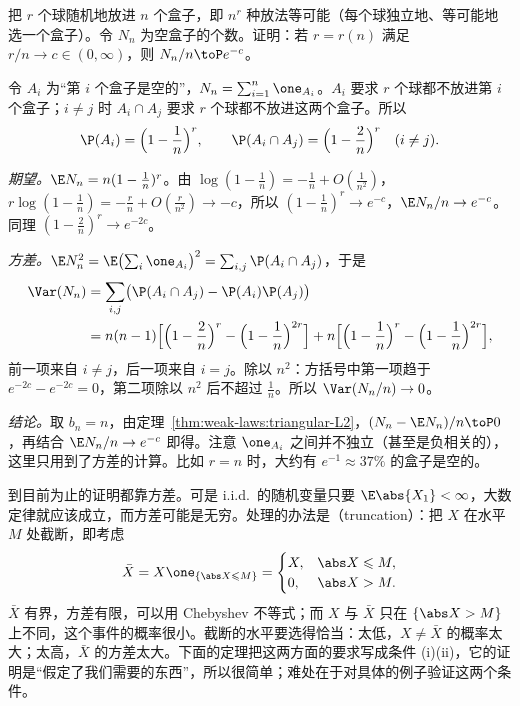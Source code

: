 \begin{workedexample}[占位问题]\label{we:weak-laws:occupancy}
把 $r$ 个球随机地放进 $n$ 个盒子，即 $n^r$ 种放法等可能（每个球独立地、等可能地选一个盒子）。令 $N_n$ 为空盒子的个数。证明：若 $r=r(n)$ 满足 $r/n\to c\in(0,\infty)$，则 $N_n/n\toP e^{-c}$。
\end{workedexample}
\begin{solution}
令 $A_i$ 为“第 $i$ 个盒子是空的”，$N_n=\sum_{i=1}^n\one_{A_i}$。$A_i$ 要求 $r$ 个球都不放进第 $i$ 个盒子；$i\neq j$ 时 $A_i\cap A_j$ 要求 $r$ 个球都不放进这两个盒子。所以
\[
\P(A_i)=\Bigl(1-\frac1n\Bigr)^r,\qquad \P(A_i\cap A_j)=\Bigl(1-\frac2n\Bigr)^r\quad(i\neq j).
\]

\emph{期望。}$\E N_n=n(1-\frac1n)^r$。由 $\log(1-\frac1n)=-\frac1n+O(\frac1{n^2})$，$r\log(1-\frac1n)=-\frac rn+O(\frac r{n^2})\to-c$，所以 $(1-\frac1n)^r\to e^{-c}$，$\E N_n/n\to e^{-c}$。同理 $(1-\frac2n)^r\to e^{-2c}$。

\emph{方差。}$\E N_n^2=\E\bigl(\sum_i\one_{A_i}\bigr)^2=\sum_{i,j}\P(A_i\cap A_j)$，于是
\[
\begin{aligned}
\Var(N_n)&=\sum_{i,j}\bigl(\P(A_i\cap A_j)-\P(A_i)\P(A_j)\bigr)\\
&=n(n-1)\Bigl[\Bigl(1-\frac2n\Bigr)^r-\Bigl(1-\frac1n\Bigr)^{2r}\Bigr]+n\Bigl[\Bigl(1-\frac1n\Bigr)^r-\Bigl(1-\frac1n\Bigr)^{2r}\Bigr],
\end{aligned}
\]
前一项来自 $i\neq j$，后一项来自 $i=j$。除以 $n^2$：方括号中第一项趋于 $e^{-2c}-e^{-2c}=0$，第二项除以 $n^2$ 后不超过 $\frac1n$。所以 $\Var(N_n/n)\to0$。

\emph{结论。}取 $b_n=n$，由定理~\ref{thm:weak-laws:triangular-L2}，$(N_n-\E N_n)/n\toP0$，再结合 $\E N_n/n\to e^{-c}$ 即得。注意 $\one_{A_i}$ 之间并不独立（甚至是负相关的），这里只用到了方差的计算。比如 $r=n$ 时，大约有 $e^{-1}\approx37\%$ 的盒子是空的。
\end{solution}


到目前为止的证明都靠方差。可是 i.i.d.\ 的随机变量只要 $\E\abs{X_1}<\infty$，大数定律就应该成立，而方差可能是无穷。处理的办法是（truncation）：把 $X$ 在水平 $M$ 处截断，即考虑
\[
\bar X=X\one_{\{\abs X\leqslant M\}}=\begin{cases}X,&\abs X\leqslant M,\\0,&\abs X>M.\end{cases}
\]
$\bar X$ 有界，方差有限，可以用 Chebyshev 不等式；而 $X$ 与 $\bar X$ 只在 $\{\abs X>M\}$ 上不同，这个事件的概率很小。截断的水平要选得恰当：太低，$X\neq\bar X$ 的概率太大；太高，$\bar X$ 的方差太大。下面的定理把这两方面的要求写成条件 (i)(ii)，它的证明是“假定了我们需要的东西”，所以很简单；难处在于对具体的例子验证这两个条件。


